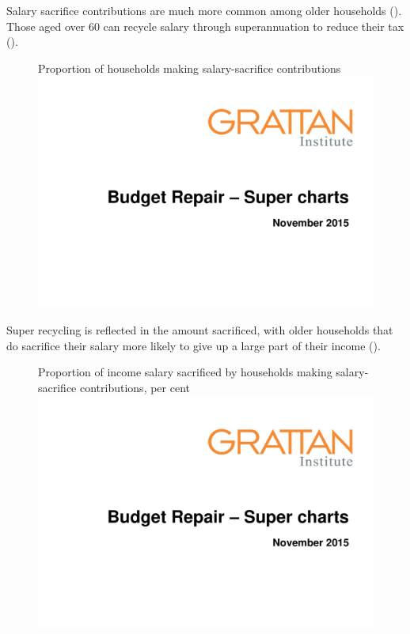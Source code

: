 \begin{subappendices}
\begin{figure}
\end{figure}

Salary sacrifice contributions are much more common among older households (). Those aged over 60 can recycle salary through superannuation to reduce their tax ().

\begin{figure}
%
{Proportion of households making salary-sacrifice contributions}\label{fig:SUPER-A-5}
\includegraphics[width=\columnwidth,page=39]{super-atlas/PPTX.pdf}
\end{figure}

Super recycling is reflected in the amount sacrificed, with older households that do sacrifice their salary more likely to give up a large part of their income (). 

\begin{figure}
%
{Proportion of income salary sacrificed by households making salary-sacrifice contributions, per cent}
\includegraphics[width=\columnwidth,page=40]{super-atlas/PPTX.pdf}


\end{figure}
\end{subappendices}
